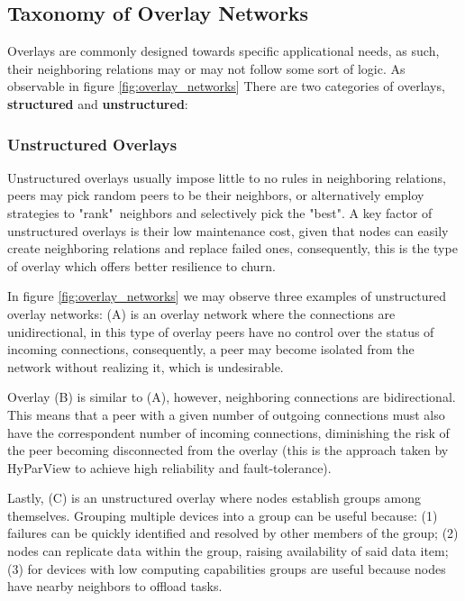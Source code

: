 \subsection{Taxonomy of Overlay Networks}

Overlays are commonly designed towards specific applicational needs, as such, their neighboring relations may or may not follow some sort of logic. As observable in figure \ref{fig:overlay_networks} There are two categories of overlays, \textbf{structured} and \textbf{unstructured}:

\subsubsection*{Unstructured Overlays}

Unstructured overlays usually impose little to no rules in neighboring relations, peers may pick random peers to be their neighbors, or alternatively employ strategies to "rank"\ neighbors and selectively pick the "best". A key factor of unstructured overlays is their low maintenance cost, given that nodes can easily create neighboring relations and replace failed ones, consequently, this is the type of overlay which offers better resilience to churn.

In figure \ref{fig:overlay_networks} we may observe three examples of unstructured overlay networks: (A) is an overlay network where the connections are unidirectional, in this type of overlay peers have no control over the status of incoming connections, consequently, a peer may become isolated from the network without realizing it, which is undesirable.

Overlay (B) is similar to (A), however, neighboring connections are bidirectional. This means that a peer with a given number of outgoing connections must also have the correspondent number of incoming connections, diminishing the risk of the peer becoming disconnected from the overlay (this is the approach taken by HyParView \cite{Hyparview} to achieve high reliability and fault-tolerance).

Lastly, (C) is an unstructured overlay where nodes establish groups among themselves. Grouping multiple devices into a group can be useful because: (1) failures can be quickly identified and resolved by other members of the group; (2) nodes can replicate data within the group, raising availability of said data item; (3) for devices with low computing capabilities groups are useful because nodes have nearby neighbors to offload tasks.


